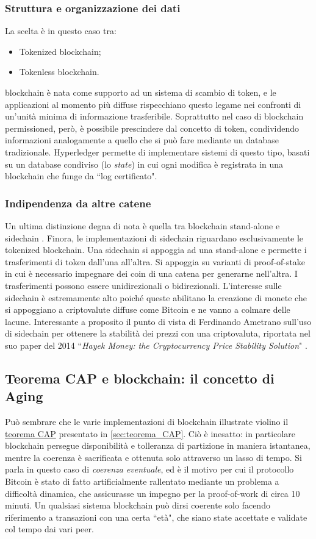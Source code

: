 		\subsubsection{Struttura e organizzazione dei dati}
			La scelta è in questo caso tra:
			\begin{itemize}
				\item Tokenized blockchain;
				\item Tokenless blockchain.
			\end{itemize}
			blockchain è nata come supporto ad un sistema di scambio di token, e le applicazioni al momento più diffuse rispecchiano questo legame nei confronti di un'unità minima di informazione trasferibile. Soprattutto nel caso di blockchain permissioned, però, è possibile prescindere dal concetto di token, condividendo informazioni analogamente a quello che si può fare mediante un database tradizionale. Hyperledger permette di implementare sistemi di questo tipo, basati su un database condiviso (lo \emph{state}) in cui ogni modifica è registrata in una blockchain che funge da ``log certificato".
		
		\subsubsection{Indipendenza da altre catene}
			Un ultima distinzione degna di nota è quella tra blockchain stand-alone e sidechain \cite{sidechain}. Finora, le implementazioni di sidechain riguardano esclusivamente le tokenized blockchain. Una sidechain si appoggia ad una stand-alone e permette i trasferimenti di token dall'una all'altra. Si appoggia su varianti di proof-of-stake in cui è necessario impegnare dei coin di una catena per generarne nell'altra. I trasferimenti possono essere unidirezionali o bidirezionali. L'interesse sulle sidechain è estremamente alto poiché queste abilitano la creazione di monete che si appoggiano a criptovalute diffuse come Bitcoin e ne vanno a colmare delle lacune. Interessante a proposito il punto di vista di Ferdinando Ametrano sull'uso di sidechain per ottenere la stabilità dei prezzi con una criptovaluta, riportata nel suo paper del 2014 ``\emph{Hayek Money: the Cryptocurrency Price Stability Solution}" \cite{hayek_money}.

	\subsection{Teorema CAP e blockchain: il concetto di Aging}
		Può sembrare che le varie implementazioni di blockchain illustrate violino il \hyperref[sec:teorema_CAP]{teorema CAP} presentato in \ref{sec:teorema_CAP}. Ciò è inesatto: in particolare blockchain persegue disponibilità e tolleranza di partizione in maniera istantanea, mentre la coerenza è sacrificata e ottenuta solo attraverso un lasso di tempo. Si parla in questo caso di \emph{coerenza eventuale}, ed è il motivo per cui il protocollo Bitcoin è stato di fatto artificialmente rallentato mediante un problema a difficoltà dinamica, che assicurasse un impegno per la proof-of-work di circa 10 minuti. Un qualsiasi sistema blockchain può dirsi coerente solo facendo riferimento a transazioni con una certa ``età", che siano state accettate e validate col tempo dai vari peer.

